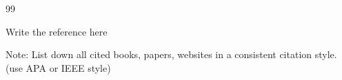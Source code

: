 \cleardoublepage
{}
{}
\begin{thebibliography}{99}

Write the reference here


\end{thebibliography}

Note: List down all cited books, papers, websites in a consistent citation style. (use APA or IEEE style)

